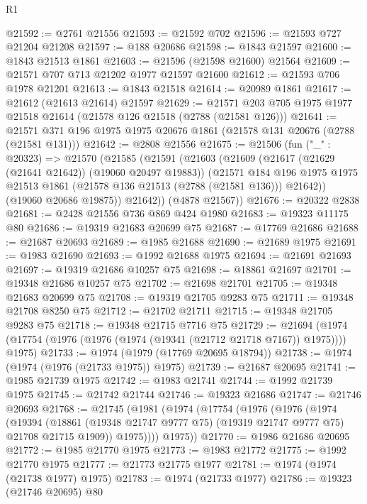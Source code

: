 \begin{lexlean}{R1}
\begin{coremodule}
@21592 := @2761 @21556
@21593 := @21592 @702
@21596 := @21593 @727 @21204 @21208
@21597 := @188 @20686
@21598 := @1843 @21597
@21600 := @1843 @21513 @1861
@21603 := @21596 (@21598 @21600) @21564
@21609 := @21571 @707 @713 @21202 @1977 @21597 @21600
@21612 := @21593 @706 @1978 @21201
@21613 := @1843 @21518
@21614 := @20989 @1861
@21617 := @21612 (@21613 @21614) @21597
@21629 := @21571 @203 @705 @1975 @1977 @21518 @21614 (@21578 @126 @21518 (@2788 (@21581 @126)))
@21641 := @21571 @371 @196 @1975 @1975 @20676 @1861 (@21578 @131 @20676 (@2788 (@21581 @131)))
@21642 := @2808 @21556
@21675 := @21506
    (fun ("_" : @20323) =>
    @21570
      (@21585
        (@21591
          (@21603
            (@21609
              (@21617 (@21629 (@21641 @21642)) (@19060 @20497 @19883))
              (@21571
                @184
                @196
                @1975
                @1975
                @21513
                @1861
                (@21578 @136 @21513 (@2788 (@21581 @136)))
                @21642))
            (@19060 @20686 @19875))
          @21642))
      (@4878 @21567))
@21676 := @20322 @2838
@21681 := @2428 @21556 @736 @869 @424 @1980
@21683 := @19323 @11175 @80
@21686 := @19319 @21683 @20699 @75
@21687 := @17769 @21686
@21688 := @21687 @20693
@21689 := @1985 @21688
@21690 := @21689 @1975
@21691 := @1983 @21690
@21693 := @1992 @21688 @1975
@21694 := @21691 @21693
@21697 := @19319 @21686 @10257 @75
@21698 := @18861 @21697
@21701 := @19348 @21686 @10257 @75
@21702 := @21698 @21701
@21705 := @19348 @21683 @20699 @75
@21708 := @19319 @21705 @9283 @75
@21711 := @19348 @21708 @8250 @75
@21712 := @21702 @21711
@21715 := @19348 @21705 @9283 @75
@21718 := @19348 @21715 @7716 @75
@21729 := @21694 (@1974 (@17754 (@1976 (@1976 (@1974 (@19341 (@21712 @21718 @7167)) @1975)))) @1975)
@21733 := @1974 (@1979 (@17769 @20695 @18794))
@21738 := @1974 (@1974 (@1976 (@21733 @1975)) @1975)
@21739 := @21687 @20695
@21741 := @1985 @21739 @1975
@21742 := @1983 @21741
@21744 := @1992 @21739 @1975
@21745 := @21742 @21744
@21746 := @19323 @21686
@21747 := @21746 @20693
@21768 := @21745
    (@1981
      (@1974
        (@17754
          (@1976
            (@1976
              (@1974
                (@19394
                  (@18861 (@19348 @21747 @9777 @75) (@19319 @21747 @9777 @75) @21708 @21715 @1909))
                @1975))))
        @1975))
@21770 := @1986 @21686 @20695
@21772 := @1985 @21770 @1975
@21773 := @1983 @21772
@21775 := @1992 @21770 @1975
@21777 := @21773 @21775 @1977
@21781 := @1974 (@1974 (@21738 @1977) @1975)
@21783 := @1974 (@21733 @1977)
@21786 := @19323 (@21746 @20695) @80

\end{coremodule}
\end{lexlean}
